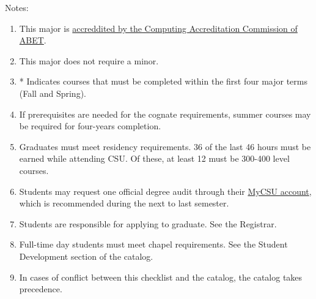 Notes:%
\begin{enumerate}\footnotesize
	\item This major is
		\href{https://www.abet.org/accreditation/what-is-accreditation/why-abet-accreditation-matters/}{accreddited by the Computing Accreditation Commission of ABET}.
	\item This major does not require a minor.
	\item * Indicates courses that must be completed within the first four major terms (Fall and Spring).
	\item If prerequisites are needed for the cognate requirements, summer courses may be required for four-years completion.
	\item Graduates must meet residency requirements. 36 of the last 46 hours must be earned while attending CSU. Of these, at least 12 must be 300-400 level courses.
	\item Students may request one official degree audit through their \href{https://portal.csuniv.edu/}{MyCSU account}, which is recommended during the next to last semester.
	\item Students are responsible for applying to graduate. See the Registrar.
	\item Full-time day students must meet chapel requirements. See the Student Development section of the catalog.
	\item In cases of conflict between this checklist and the catalog, the catalog takes precedence.
\end{enumerate}